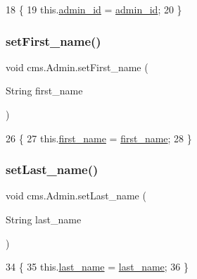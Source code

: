 \begin{DoxyCode}
18                                           \{
19         this.\mbox{\hyperlink{classcms_1_1_admin_af3be9e8376e013a240ae51c28e7e8d6e}{admin\_id}} = \mbox{\hyperlink{classcms_1_1_admin_af3be9e8376e013a240ae51c28e7e8d6e}{admin\_id}};
20     \}
\end{DoxyCode}
\mbox{\label{classcms_1_1_admin_a36721754a671a55dfe4b57e02a45f7c8}} 
\subsubsection{\texorpdfstring{set\+First\+\_\+name()}{setFirst\_name()}}
{\footnotesize\ttfamily void cms.\+Admin.\+set\+First\+\_\+name (\begin{DoxyParamCaption}\item[{String}]{first\+\_\+name }\end{DoxyParamCaption})\hspace{0.3cm}{\ttfamily [inline]}}


\begin{DoxyCode}
26                                                  \{
27         this.\mbox{\hyperlink{classcms_1_1_admin_ad476f88383b7c36bfbd70be502be4202}{first\_name}} = \mbox{\hyperlink{classcms_1_1_admin_ad476f88383b7c36bfbd70be502be4202}{first\_name}};
28     \}
\end{DoxyCode}
\mbox{\label{classcms_1_1_admin_a713b40166c6c00ba4df46643d3ae5be2}} 
\subsubsection{\texorpdfstring{set\+Last\+\_\+name()}{setLast\_name()}}
{\footnotesize\ttfamily void cms.\+Admin.\+set\+Last\+\_\+name (\begin{DoxyParamCaption}\item[{String}]{last\+\_\+name }\end{DoxyParamCaption})\hspace{0.3cm}{\ttfamily [inline]}}


\begin{DoxyCode}
34                                                \{
35         this.\mbox{\hyperlink{classcms_1_1_admin_abe31ed0d83c09185e6e4f6c1a3d3c685}{last\_name}} = \mbox{\hyperlink{classcms_1_1_admin_abe31ed0d83c09185e6e4f6c1a3d3c685}{last\_name}};
36     \}
\end{DoxyCode}
\mbox{\label{classcms_1_1_admin_ab98a8c143d4b3f4f4a49cfec7a8c9d78}} 
